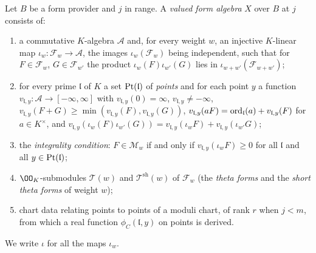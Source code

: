 \begin{definition}\label{pf:onto1:PJ}
Let $B$ be a form provider and $j$ in range. A \emph{valued form algebra} $X$ over $B$ at $j$ consists of:
\begin{enumerate}[label=(\roman*)]
\item a commutative $K$-algebra $\mathcal A$ and, for every weight $w$, an injective $K$-linear map
$\iota_w\colon\mathcal F_w\to\mathcal A$, the images $\iota_w(\mathcal F_w)$ being independent, such that for
$F\in\mathcal F_w$, $G\in\mathcal F_{w'}$ the product $\iota_w(F)\iota_{w'}(G)$ lies in $\iota_{w+w'}(\mathcal F_{w+w'})$;
\item for every prime $\mathfrak l$ of $K$ a set $\operatorname{Pt}(\mathfrak l)$ of \emph{points} and for each point $y$
a function $v_{\mathfrak l,y}\colon\mathcal A\to[-\infty,\infty]$ with $v_{\mathfrak l,y}(0)=\infty$,
$v_{\mathfrak l,y}\ne-\infty$, $v_{\mathfrak l,y}(F+G)\ge\min(v_{\mathfrak l,y}(F),v_{\mathfrak l,y}(G))$,
$v_{\mathfrak l,y}(aF)=\operatorname{ord}_{\mathfrak l}(a)+v_{\mathfrak l,y}(F)$ for $a\in K^\times$, and
$v_{\mathfrak l,y}(\iota_w(F)\iota_{w'}(G))=v_{\mathfrak l,y}(\iota_wF)+v_{\mathfrak l,y}(\iota_{w'}G)$;
\item the \emph{integrality condition}: $F\in\mathcal M_w$ if and only if $v_{\mathfrak l,y}(\iota_wF)\ge0$ for
all $\mathfrak l$ and all $y\in\operatorname{Pt}(\mathfrak l)$;
\item $\OO_K$-submodules $\mathcal T(w)$ and $\mathcal T^{\mathrm{sh}}(w)$ of $\mathcal F_w$ (the \emph{theta forms}
and the \emph{short theta forms} of weight $w$);
\item chart data relating points to points of a moduli chart, of rank $r$ when $j<m$, from which a real
function $\phi_C(\mathfrak l,y)$ on points is derived.
\end{enumerate}
We write $\iota$ for all the maps $\iota_w$.
\end{definition}

